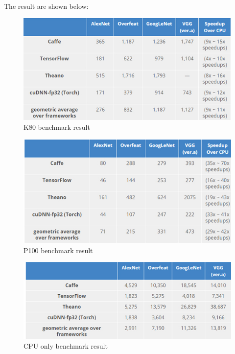 \documentclass[conference]{IEEEtran}
\begin{document}
The result are shown below:
\begin{figure}[H]
\centering
  \begin{minipage}{.4\textwidth}
    \centering
    \includegraphics[width=1.0\linewidth]{k80_benchmark.jpg}
    \caption{K80 benchmark result}
    \label{fig:fig_1}
  \end{minipage}
\end{figure}

\begin{figure}[H]
\centering
  \begin{minipage}{.4\textwidth}
    \centering
    \includegraphics[width=1.0\linewidth]{P100_benchmark.jpg}
    \caption{P100 benchmark result}
    \label{fig:fig_1}
  \end{minipage}
\end{figure}

\begin{figure}[H]
\centering
  \begin{minipage}{.4\textwidth}
    \centering
    \includegraphics[width=1.0\linewidth]{cpu_only.jpg}
    \caption{CPU only benchmark result}
    \label{fig:fig_1}
  \end{minipage}
\end{figure}
\end{document}
